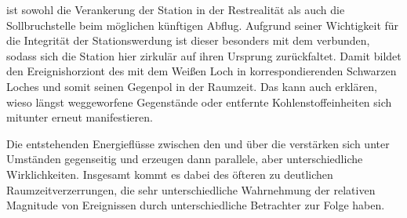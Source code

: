 \begin{newstuff}
         ist sowohl die Verankerung der Station in der Restrealität als auch die Sollbruchstelle beim möglichen künftigen Abflug. Aufgrund seiner Wichtigkeit für die Integrität der Stationswerdung ist dieser  besonders mit dem  verbunden, sodass sich die Station hier zirkulär auf ihren Ursprung zurückfaltet. Damit bildet  den Ereignishorziont des mit dem Weißen Loch in  korrespondierenden Schwarzen Loches und somit seinen Gegenpol in der Raumzeit. Das kann auch erklären, wieso längst weggeworfene Gegenstände oder entfernte Kohlenstoffeinheiten sich mitunter erneut manifestieren.
        
        Die entstehenden Energieflüsse zwischen den  und über die  verstärken sich unter Umständen gegenseitig und erzeugen dann parallele, aber unterschiedliche Wirklichkeiten. Insgesamt kommt es dabei des öfteren zu deutlichen Raumzeitverzerrungen, die sehr unterschiedliche Wahrnehmung der relativen Magnitude von Ereignissen durch unterschiedliche Betrachter zur Folge haben.
    \end{newstuff}